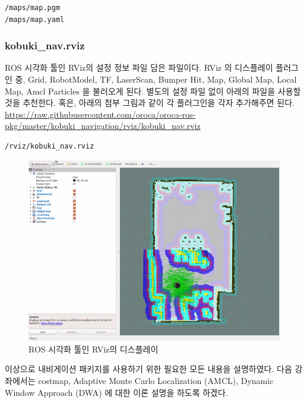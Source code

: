 \vspace{\baselineskip}
\begin{lstlisting}[language=ROS]
/maps/map.pgm
/maps/map.yaml
\end{lstlisting}

\subsubsection{kobuki\_nav.rviz}
ROS 시각화 툴인 RViz의 설정 정보 파일 담은 파일이다. RViz 의 디스플레이 플러그인 중, Grid, RobotModel, TF, LaserScan, Bumper Hit, Map, Global Map, Local Map, Amcl Particles 을 불러오게 된다. 별도의 설정 파일 없이 아래의 파일을 사용할 것을 추천한다. 혹은, 아래의 첨부 그림과 같이 각 플러그인을 각자 추가해주면 된다.\\

\url{https://raw.githubusercontent.com/oroca/oroca-ros-pkg/master/kobuki_navigation/rviz/kobuki_nav.rviz}

\vspace{\baselineskip}
\begin{lstlisting}[language=ROS]
/rviz/kobuki_nav.rviz
\end{lstlisting}

\begin{figure}[h]
\centering
\includegraphics[width=0.9\columnwidth]{pictures/chapter11/kobuki_nav_rviz.png}
\caption{ROS 시각화 툴인 RViz의 디스플레이}
\end{figure}

이상으로 내비게이션 패키지를 사용하기 위한 필요한 모든 내용을 설명하였다. 다음 강좌에서는 costmap, Adaptive Monte Carlo Localization (AMCL), Dynamic Window Approach (DWA) 에 대한 이론 설명을 하도록 하겠다.


